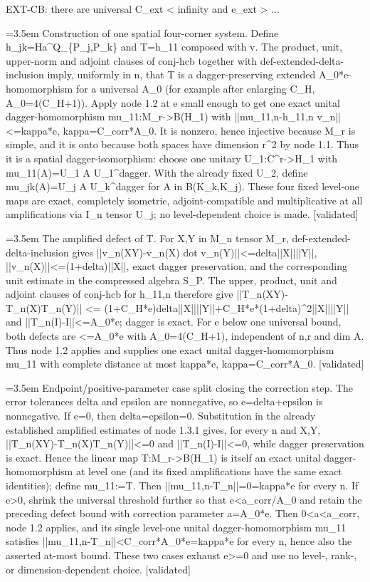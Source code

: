 \documentclass{article}
\newcommand{\step}[1]{\par\noindent\hangindent=3.5em\hangafter=1%
  \makebox[3.5em][l]{\textbf{#1.}}}
\newcommand{\steptag}[1]{\hfill{\small\textsf{[#1]}}}
\begin{document}
\begin{proofbox}{EXT-CB: there are universal C\_ext < infinity and e\_ext > ...}
\step{1.3} Construction of one spatial four-corner system. Define h\_jk=Ha\textasciicircum{}Q\_\{P\_j,P\_k\} and T=h\_11 composed with v. The product, unit, upper-norm and adjoint clauses of conj-hcb together with def-extended-delta-inclusion imply, uniformly in n, that T is a dagger-preserving extended A\_0*e-homomorphism for a universal A\_0 (for example after enlarging C\_H, A\_0=4(C\_H+1)). Apply node 1.2 at e small enough to get one exact unital dagger-homomorphism mu\_11:M\_r->B(H\_1) with ||mu\_11,n-h\_11,n v\_n||<=kappa*e, kappa=C\_corr*A\_0. It is nonzero, hence injective because M\_r is simple, and it is onto because both spaces have dimension r\textasciicircum{}2 by node 1.1. Thus it is a spatial dagger-isomorphism: choose one unitary U\_1:C\textasciicircum{}r->H\_1 with mu\_11(A)=U\_1 A U\_1\textasciicircum{}dagger. With the already fixed U\_2, define mu\_jk(A)=U\_j A U\_k\textasciicircum{}dagger for A in B(K\_k,K\_j). These four fixed level-one maps are exact, completely isometric, adjoint-compatible and multiplicative at all amplifications via I\_n tensor U\_j; no level-dependent choice is made. \steptag{validated} \\[6pt]
\step{1.3.1} The amplified defect of T. For X,Y in M\_n tensor M\_r, def-extended-delta-inclusion gives ||v\_n(XY)-v\_n(X) dot v\_n(Y)||<=delta||X||||Y||, ||v\_n(X)||<=(1+delta)||X||, exact dagger preservation, and the corresponding unit estimate in the compressed algebra S\_P. The upper, product, unit and adjoint clauses of conj-hcb for h\_11,n therefore give ||T\_n(XY)-T\_n(X)T\_n(Y)|| <= (1+C\_H*e)delta||X||||Y||+C\_H*e*(1+delta)\textasciicircum{}2||X||||Y|| and ||T\_n(I)-I||<=A\_0*e; dagger is exact. For e below one universal bound, both defects are <=A\_0*e with A\_0=4(C\_H+1), independent of n,r and dim A. Thus node 1.2 applies and supplies one exact unital dagger-homomorphism mu\_11 with complete distance at most kappa*e, kappa=C\_corr*A\_0. \steptag{validated} \\[6pt]
\step{1.3.1.1} Endpoint/positive-parameter case split closing the correction step. The error tolerances delta and epsilon are nonnegative, so e=delta+epsilon is nonnegative. If e=0, then delta=epsilon=0. Substitution in the already established amplified estimates of node 1.3.1 gives, for every n and X,Y, ||T\_n(XY)-T\_n(X)T\_n(Y)||<=0 and ||T\_n(I)-I||<=0, while dagger preservation is exact. Hence the linear map T:M\_r->B(H\_1) is itself an exact unital dagger-homomorphism at level one (and its fixed amplifications have the same exact identities); define mu\_11:=T. Then ||mu\_11,n-T\_n||=0=kappa*e for every n. If e>0, shrink the universal threshold further so that e<a\_corr/A\_0 and retain the preceding defect bound with correction parameter a=A\_0*e. Then 0<a<a\_corr, node 1.2 applies, and its single level-one unital dagger-homomorphism mu\_11 satisfies ||mu\_11,n-T\_n||<C\_corr*A\_0*e=kappa*e for every n, hence also the asserted at-most bound. These two cases exhaust e>=0 and use no level-, rank-, or dimension-dependent choice. \steptag{validated} \\[6pt]

\end{proofbox}
\end{document}
